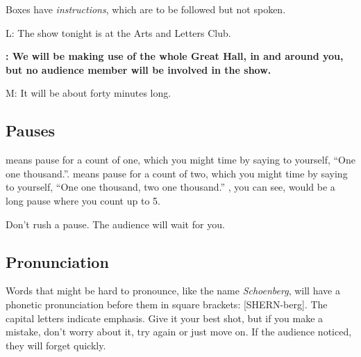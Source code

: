 Boxes have \textit{instructions}, which are to be followed but not spoken.


\vspace{0.5\baselineskip}
\vspace{0.5\baselineskip}





L:  The show tonight is at the Arts and Letters Club. 

\textbf{\performerletter{\speaker}:  We will be making use of the whole Great Hall, in and around you, but no audience member will be involved in the show.}

M:  It will be about forty minutes long.

\subsection*{Pauses}

 means pause for a count of one, which you might time by saying to yourself, ``One one thousand.''.   means pause for a count of two, which you might time by saying to yourself, ``One one thousand, two one thousand.''  , you can see, would be a long pause where you count up to 5.

Don't rush a pause.  The audience will wait for you.

\subsection*{Pronunciation}

Words that might be hard to pronounce, like the name \textit{Schoenberg}, will have a phonetic pronunciation before them in square brackets: [SHERN-berg].  The capital letters indicate emphasis.  Give it your best shot, but if you make a mistake, don't worry about it, try again or just move on.  If the audience noticed, they will forget quickly.

